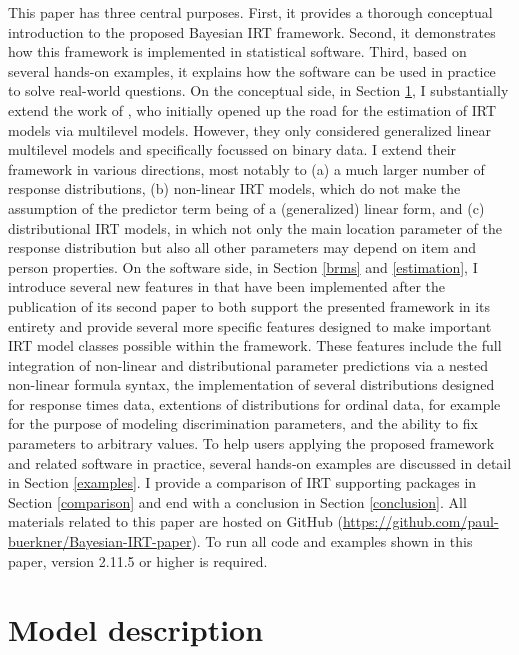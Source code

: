 \documentclass[
]{jss}
\begin{document}
This paper has three central purposes. First, it provides a thorough
conceptual introduction to the proposed Bayesian IRT framework. Second,
it demonstrates how this framework is implemented in statistical
software. Third, based on several hands-on examples, it explains how the
software can be used in practice to solve real-world questions. On the
conceptual side, in Section \ref{model}, I substantially extend the work
of \citet{deboeck2011}, who initially opened up the road for the
estimation of IRT models via multilevel models. However, they only
considered generalized linear multilevel models and specifically
focussed on binary data. I extend their framework in various directions,
most notably to (a) a much larger number of response distributions, (b)
non-linear IRT models, which do not make the assumption of the predictor
term being of a (generalized) linear form, and (c) distributional IRT
models, in which not only the main location parameter of the response
distribution but also all other parameters may depend on item and person
properties. On the software side, in Section \ref{brms} and
\ref{estimation}, I introduce several new features in  that
have been implemented after the publication of its second paper
\citep{brms2} to both support the presented framework in its entirety
and provide several more specific features designed to make important
IRT model classes possible within the framework. These features include
the full integration of non-linear and distributional parameter
predictions via a nested non-linear formula syntax, the implementation
of several distributions designed for response times data, extentions of
distributions for ordinal data, for example for the purpose of modeling
discrimination parameters, and the ability to fix parameters to
arbitrary values. To help users applying the proposed framework and
related software in practice, several hands-on examples are discussed in
detail in Section \ref{examples}. I provide a comparison of IRT
supporting  packages in Section \ref{comparison} and end
with a conclusion in Section \ref{conclusion}. All materials related to
this paper are hosted on GitHub
(\url{https://github.com/paul-buerkner/Bayesian-IRT-paper}). To run all
code and examples shown in this paper,  version 2.11.5 or
higher is required.

\hypertarget{model}{%
\section{Model description}\label{model}}
\end{document}
